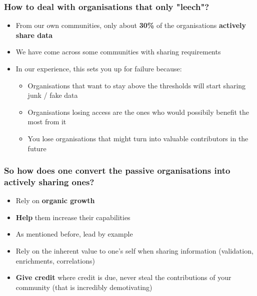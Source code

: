 \begin{frame}
\frametitle{How to deal with organisations that only "leech"?}
\begin{itemize}
    \item From our own communities, only about {\bf 30\%} of the organisations {\bf actively share data}
	\item We have come across some communities with sharing requirements
	\item In our experience, this sets you up for failure because:
	\begin{itemize}
		\item Organisations that want to stay above the thresholds will start sharing junk / fake data
		\item Organisations losing access are the ones who would possibily benefit the most from it
		\item You lose organisations that might turn into valuable contributors in the future
	\end{itemize}
\end{itemize}
\end{frame}

\begin{frame}
	\frametitle{So how does one convert the passive organisations into actively sharing ones?}
	\begin{itemize}
		\item Rely on {\bf organic growth}
		\item {\bf Help} them increase their capabilities
		\item As mentioned before, lead by example
		\item Rely on the inherent value to one's self when sharing information (validation, enrichments, correlations)
		\item {\bf Give credit} where credit is due, never steal the contributions of your community (that is incredibly demotivating)
	\end{itemize}
\end{frame}

